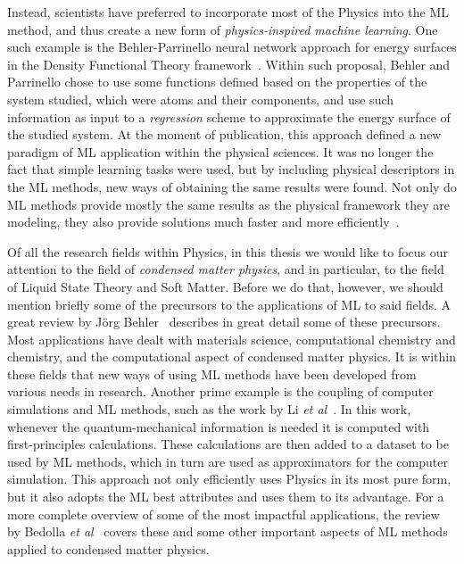 Instead, scientists have preferred to incorporate most of the Physics into the ML
method, and thus create a new form of \emph{physics-inspired machine learning}.
One such example is the Behler-Parrinello neural network approach for energy surfaces
in the Density Functional Theory framework~\cite{behlerGeneralizedNeuralNetworkRepresentation2007a}.
Within such proposal, Behler and Parrinello chose to use some functions defined based
on the properties of the system studied, which were atoms and their components,
and use such information as input to a \emph{regression} scheme to approximate the
energy surface of the studied system. At the moment of publication, this approach
defined a new paradigm of ML application within the physical sciences. It was no longer
the fact that simple learning tasks were used, but by including physical descriptors
in the ML methods, new ways of obtaining the same results were found.
Not only do ML methods provide mostly the same results as the physical framework they
are modeling, they also provide solutions much faster and more efficiently~\cite{zhuPhysicsconstrainedDeepLearning2019}.

Of all the research fields within Physics, in this thesis we would like to focus
our attention to the field of \emph{condensed matter physics}, and in particular, to the
field of Liquid State Theory and Soft Matter. Before we do that, however, we should
mention briefly some of the precursors to the applications of ML to said fields.
A great review by J\"{o}rg Behler~\cite{behlerPerspectiveMachineLearning2016a}
describes in great detail some of these precursors. Most applications have dealt with
materials science, computational chemistry and chemistry, and the computational aspect
of condensed matter physics. It is within these fields that new ways of using ML methods
have been developed from various needs in research. Another prime example is the coupling
of computer simulations and ML methods, such as the work by Li \emph{et al}~\cite{liMolecularDynamicsOntheFly2015}.
In this work, whenever the quantum-mechanical information is needed it is computed with
first-principles calculations. These calculations are then added to a dataset to be used
by ML methods, which in turn are used as approximators for the computer simulation.
This approach not only efficiently uses Physics in its most pure form, but it also
adopts the ML best attributes and uses them to its advantage.
For a more complete overview of some of the most impactful applications, the
review by Bedolla \emph{et al}~\cite{bedollaMachineLearningCondensed2020}
covers these and some other important aspects of ML methods applied to
condensed matter physics.

